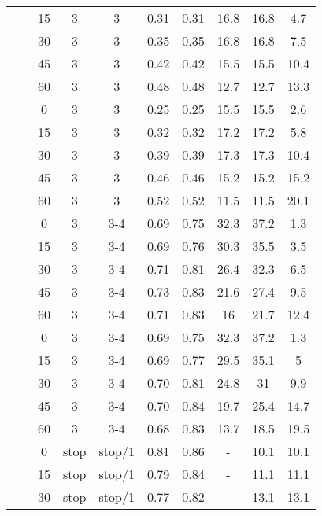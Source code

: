 \begin{longtable}[h!]{cccccccccc}
\nopagebreak
&  & 15 & 3 & 3 & 0.31 & 0.31 & 16.8 & 16.8 & 4.7\\
\nopagebreak
&  & 30 & 3 & 3 & 0.35 & 0.35 & 16.8 & 16.8 & 7.5\\
\nopagebreak
&  & 45 & 3 & 3 & 0.42 & 0.42 & 15.5 & 15.5 & 10.4\\
\nopagebreak
& \multirow{-5}{*}{\centering\arraybackslash 0.2} & 60 & 3 & 3 & 0.48 & 0.48 & 12.7 & 12.7 & 13.3\\
\nopagebreak
&  & 0 & 3 & 3 & 0.25 & 0.25 & 15.5 & 15.5 & 2.6\\
\nopagebreak
&  & 15 & 3 & 3 & 0.32 & 0.32 & 17.2 & 17.2 & 5.8\\
\nopagebreak
&  & 30 & 3 & 3 & 0.39 & 0.39 & 17.3 & 17.3 & 10.4\\
\nopagebreak
&  & 45 & 3 & 3 & 0.46 & 0.46 & 15.2 & 15.2 & 15.2\\
\nopagebreak
\multirow{-10}{*}{\centering\arraybackslash 3} & \multirow{-5}{*}{\centering\arraybackslash 0.33} & 60 & 3 & 3 & 0.52 & 0.52 & 11.5 & 11.5 & 20.1\\
\cmidrule{1-10}\pagebreak[0]
&  & 0 & 3 & 3-4 & 0.69 & 0.75 & 32.3 & 37.2 & 1.3\\
\nopagebreak
&  & 15 & 3 & 3-4 & 0.69 & 0.76 & 30.3 & 35.5 & 3.5\\
\nopagebreak
&  & 30 & 3 & 3-4 & 0.71 & 0.81 & 26.4 & 32.3 & 6.5\\
\nopagebreak
&  & 45 & 3 & 3-4 & 0.73 & 0.83 & 21.6 & 27.4 & 9.5\\
\nopagebreak
& \multirow{-5}{*}{\centering\arraybackslash 0.2} & 60 & 3 & 3-4 & 0.71 & 0.83 & 16 & 21.7 & 12.4\\
\nopagebreak
&  & 0 & 3 & 3-4 & 0.69 & 0.75 & 32.3 & 37.2 & 1.3\\
\nopagebreak
&  & 15 & 3 & 3-4 & 0.69 & 0.77 & 29.5 & 35.1 & 5\\
\nopagebreak
&  & 30 & 3 & 3-4 & 0.70 & 0.81 & 24.8 & 31 & 9.9\\
\nopagebreak
&  & 45 & 3 & 3-4 & 0.70 & 0.84 & 19.7 & 25.4 & 14.7\\
\nopagebreak
\multirow{-10}{*}{\centering\arraybackslash 4} & \multirow{-5}{*}{\centering\arraybackslash 0.33} & 60 & 3 & 3-4 & 0.68 & 0.83 & 13.7 & 18.5 & 19.5\\
\cmidrule{1-10}\pagebreak[0]
&  & 0 & stop & stop/1 & 0.81 & 0.86 & - & 10.1 & 10.1\\
\nopagebreak
&  & 15 & stop & stop/1 & 0.79 & 0.84 & - & 11.1 & 11.1\\
\nopagebreak
&  & 30 & stop & stop/1 & 0.77 & 0.82 & - & 13.1 & 13.1\\

\end{longtable}

